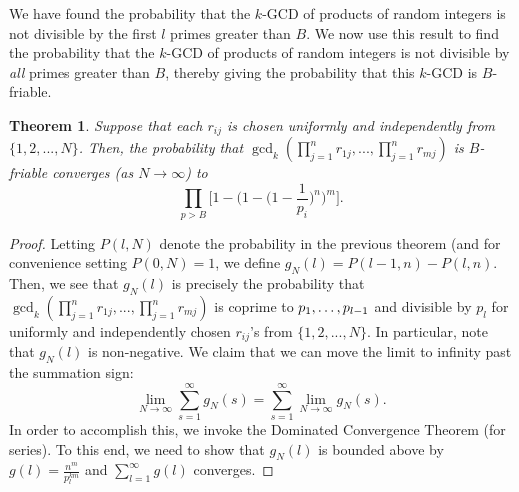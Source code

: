 \documentclass[12pt]{amsart}
\newtheorem{theorem}{Theorem}[subsection]
\theoremstyle{definition}
\begin{document}
We have found the probability that the $k$-GCD of products of random integers is not divisible by the first \(l\) primes greater than \(B\). We now use this result to find the probability that the $k$-GCD of products of random integers is not divisible by \textit{all} primes greater than $B$, thereby giving the probability that this $k$-GCD is $B$-friable.

\begin{theorem} Suppose that each $r_{ij}$ is chosen uniformly and independently from $\{1, 2, ..., N\}$. Then, the probability that $\gcd_k(\prod_{j=1}^n r_{1j}, ... , \prod_{j=1}^n r_{mj})$ is $B$-friable converges (as $N \to \infty$) to
	$$\prod_{p>B} \Big[1 - \Big(1 - \Big(1-\frac{1}{p_i}\Big)^n\Big)^m\Big].$$
\end{theorem}

\begin{proof}
	Letting $P(l, N)$ denote the probability in the previous theorem (and for convenience setting $P(0, N) = 1$, we define $g_N(l) = P(l-1, n) - P(l, n)$. Then, we see that $g_N(l)$ is precisely the probability that $\gcd_k(\prod_{j=1}^n r_{1j}, ... , \prod_{j=1}^n r_{mj})$ is coprime to $p_1, \mathellipsis, p_{l-1}$ and divisible by $p_l$ for uniformly and independently chosen $r_{ij}$'s from $\{1, 2, ..., N\}$. In particular, note that $g_N(l)$ is non-negative. We claim that we can move the limit to infinity past the summation sign:
	$$\lim_{N \to \infty} \sum_{s=1}^{\infty} g_N(s) = \sum_{s=1}^{\infty} \lim_{N \to \infty} g_N(s).$$
	In order to accomplish this, we invoke the Dominated Convergence Theorem (for series). To this end, we need to show that $g_N(l)$ is bounded above by $g(l) = \frac{n^m}{p_{l}^{km}}$ and $\sum_{l=1}^{\infty} g(l)$ converges.
	

\end{proof}
\end{document}
